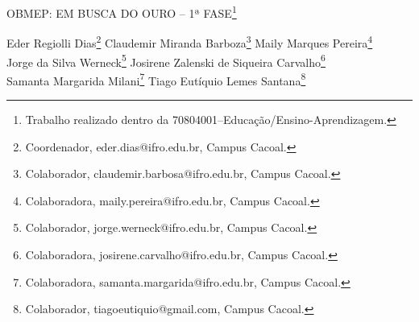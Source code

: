 \documentclass[article,12pt,onesidea,4paper,english,brazil]{abntex2}
\begin{document}
	
	
	\frenchspacing 
	
	\begin{center}
		\LARGE OBMEP: EM BUSCA DO OURO – 1ª FASE\footnote{Trabalho realizado dentro da 70804001–Educação/Ensino-Aprendizagem.}
		
		\normalsize
	Eder Regiolli Dias\footnote{Coordenador, eder.dias@ifro.edu.br, Campus Cacoal.} 
	Claudemir Miranda Barboza\footnote{Colaborador, claudemir.barbosa@ifro.edu.br, Campus Cacoal.} 
	Maily Marques Pereira\footnote{Colaboradora, maily.pereira@ifro.edu.br, Campus Cacoal.} \\
	Jorge da Silva Werneck\footnote{Colaborador, jorge.werneck@ifro.edu.br, Campus Cacoal.} 
	Josirene Zalenski de Siqueira Carvalho\footnote{Colaboradora, josirene.carvalho@ifro.edu.br, Campus Cacoal.} \\
	Samanta Margarida Milani\footnote{Colaboradora, samanta.margarida@ifro.edu.br, Campus Cacoal.} 
	Tiago Eutíquio Lemes Santana\footnote{Colaborador, tiagoeutiquio@gmail.com, Campus Cacoal.} 
	\end{center}
	
\end{document}
